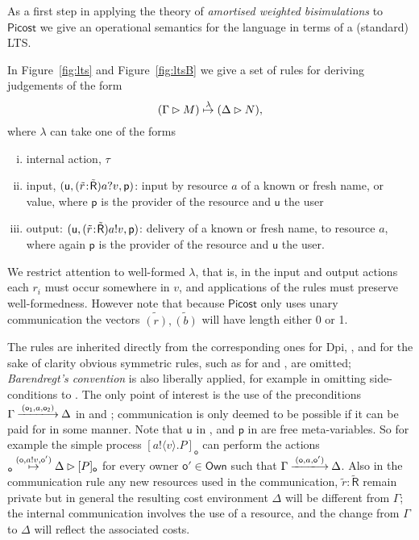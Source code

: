 \documentclass{LMCS}
\newcommand{\pfn}[1]{\mathsf{#1}}  \newcommand{\cfn}[1]{\mathsf{#1}}  \newcommand{\ownfnt}[1]{{\mathsf{#1}}}
\newcommand{\picost}{\ensuremath{\pfn{Picost}}\xspace}
\newcommand{\with}{\mathbin \rhd}
\newcommand{\Own}{\ensuremath{\pfn{Own}}\xspace}
\newcommand{\cancom}[3]{({\ownfnt{#1}},{#2},{\ownfnt{#3}}) \xspace}
\newcommand{\typeletter}[1]{{\mathsf{#1}}}
\newcommand{\tR}{\typeletter{R}}
\newcommand{\pc}[1]{\langle#1\rangle}
\newcommand{\Cassoc}[2]{ {{#1}\kern -0.2em : \kern -0.2em {#2}}}
\newcommand{\Cloc}[2]{[#1]_{\ownfnt{#2}}}
\newcommand{\ar}[1]{\mathbin{\xlongrightarrow{ #1}}}
\begin{document}
As a first step in applying the theory of \emph{amortised weighted bisimulations} to 
\picost we give an operational semantics for the language in terms of a 
(standard) LTS. 

In Figure~\ref{fig:lts} and Figure~\ref{fig:ltsB} we
give a set of rules for deriving judgements of the form
$$
(\Gamma \with M) \newar{\lambda} (\Delta \with N),
$$ 
where $\lambda$ can take one of the forms 
\begin{enumerate}[(i)]
\item  internal action, $\tau$
\item input,  $\cancom{u}{(\Cassoc{\tilde{r}}{\tilde{\tR}}) a?v}{p}$:  
input by resource $a$ of  a known or fresh name, or value, where $\ownfnt p$ is the provider
of the resource and $\ownfnt u$ the user

\item output: $\cancom{u}{(\Cassoc{\tilde r}{\tilde \tR})a!{v}}{p}$: 
delivery of a known or fresh name, to resource $a$, where again $\ownfnt p$ 
is the provider of the resource and $\ownfnt u$ the user.


\end{enumerate}
We restrict attention to well-formed $\lambda$, that is, in the input and output actions
each $r_i$ must occur somewhere in $v$, and applications of the rules must preserve
well-formedness. 
However note that because \picost only uses unary communication the vectors 
$\tilde{(r)}, \tilde{(b)}$ will have length either 0 or 1. 


The rules are inherited directly from the corresponding ones for Dpi,
\cite{dpibook}, and for the sake of clarity obvious symmetric rules, such as for 
 and , are omitted; \emph{Barendregt's convention}
is also liberally applied, for example in omitting side-conditions to
. The only point of interest is the use of the
preconditions $\Gamma \ar{\cancom{o_1}{a}{o_2}} \Delta$ in 
and ; communication is only deemed to be possible if it can
be paid for in some manner. 
Note that $\ownfnt u$ in , and
$\ownfnt p$ in  are free meta-variables. So for example the
simple process $\Cloc{a!\pc{v}.P}{o}$ can perform the actions
\begin{math}
   \Cloc{a!\pc{v}.P}{o}
          \newar{\cancom{o}{a!v}{o'}}
          \Delta \with \Cloc{P}{o}
\end{math}
for every owner $\ownfnt {o'} \in \Own$ such that $\Gamma \ar{\cancom{o}{a}{o'}} \Delta$.
Also in the communication rule  any new resources used in the communication,
$\tilde{r}:\tilde{\tR}$ remain private but in general the resulting cost environment $\Delta$ 
will be different from $\Gamma$; the internal communication involves the use of a resource,
and the change from $\Gamma$ to $\Delta$ will reflect the associated costs. 
\end{document}
